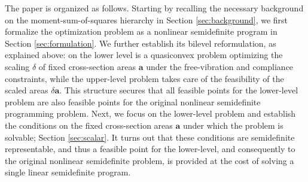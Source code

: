 \documentclass[final,onefignum,onetabnum]{siamart220329}
\begin{document}




The paper is organized as follows.
Starting by recalling the necessary background on the moment-sum-of-squares hierarchy in Section \ref{sec:background}, we first formalize the optimization problem as a nonlinear semidefinite program in Section \ref{sec:formulation}. We further establish its bilevel reformulation, as explained above: on the lower level is a quasiconvex problem optimizing the scaling $\delta$ of fixed cross-section areas $\mathbf{a}$ under the free-vibration and compliance constraints, while the upper-level problem takes care of the feasibility of the scaled areas $\delta\mathbf{a}$.
This structure secures that all feasible points for the lower-level problem are also feasible points for the original nonlinear semidefinite programming problem. Next, we focus on the lower-level problem and establish the conditions on the fixed cross-section areas $\mathbf{a}$ under which the problem is solvable; Section \ref{sec:scalar}. It turns out that these conditions are semidefinite representable, and thus a feasible point for the lower-level, and consequently to the original nonlinear semidefinite problem, is provided at the cost of solving a single linear semidefinite program.  
\end{document}
